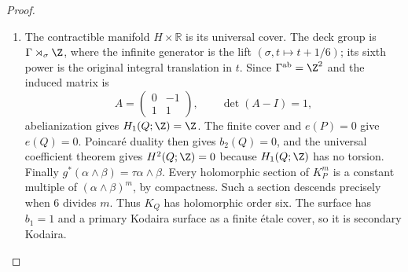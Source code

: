 \begin{proof}
\begin{enumerate}[label={$\langle1\rangle$\arabic*.},leftmargin=*]
\item The contractible manifold $H\times\mathbb R$ is its universal cover.
The deck group is $\Gamma\rtimes_\sigma\Z$, where the infinite
generator is the lift $(\sigma,t\mapsto t+1/6)$; its sixth power is
the original integral translation in $t$. Since
$\Gamma^{\rm ab}=\Z^2$ and the induced matrix is
\[
A=\begin{pmatrix}0&-1\\1&1\end{pmatrix},\qquad
\det(A-I)=1,
\]
abelianization gives $H_1(Q;\Z)=\Z$.
The finite cover and $e(P)=0$ give $e(Q)=0$. Poincar\'e duality then
gives $b_2(Q)=0$, and the universal coefficient theorem gives
$H^2(Q;\Z)=0$ because $H_1(Q;\Z)$ has no torsion.
Finally $g^*(\alpha\wedge\beta)=\tau\alpha\wedge\beta$.
Every holomorphic section of $K_P^m$ is a constant multiple of
$(\alpha\wedge\beta)^m$, by compactness. Such a section descends
precisely when $6$ divides $m$. Thus $K_Q$ has holomorphic order six.
The surface has $b_1=1$ and a primary Kodaira surface as a finite
\'etale cover, so it is secondary Kodaira.

\end{enumerate}
\end{proof}